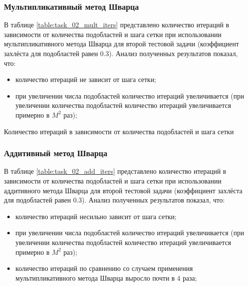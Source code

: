 \documentclass[a4paper]{article}
\begin{document}
\newpage

\subsubsection{Мультипликативный метод Шварца}

В таблице \ref{table:task_02_mult_iters} представлено количество итераций в зависимости от количества подобластей и шага сетки при использовании мультипликативного метода Шварца для второй тестовой задачи (коэффициент захлёста для подобластей равен 0.3). Анализ полученных результатов показал, что:
\begin{itemize}
\item количество итераций не зависит от шага сетки;
\item при увеличении числа подобластей количество итераций увеличивается (при увеличении количества подобластей количество итераций увеличивается примерно в $M^2$ раз);
\end{itemize}

\begin{table}[h]
\caption{Количество итераций в зависимости от количества подобластей и шага сетки}
\label{table:task_02_mult_iters}
\end{table}

\newpage

\subsubsection{Аддитивный метод Шварца}

В таблице \ref{table:task_02_add_iters} представлено количество итераций в зависимости от количества подобластей и шага сетки при использовании аддитивного метода Шварца для второй тестовой задачи (коэффициент захлёста для подобластей равен 0.3). Анализ полученных результатов показал, что:
\begin{itemize}
\item количество итераций несильно зависит от шага сетки;
\item при увеличении числа подобластей количество итераций увеличивается (при увеличении количества подобластей количество итераций увеличивается примерно в $M^2$ раз);
\item количество итераций по сравнению со случаем применения мультипликативного метода Шварца выросло почти в 4 раза;
\end{itemize}
\end{document}
